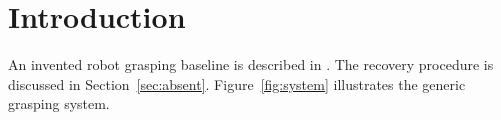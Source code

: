 \section{Introduction}
\label{sec:shared}
An invented robot grasping baseline is described in \citep{grasp_baseline,missing_robot_study}.
The recovery procedure is discussed in Section~\ref{sec:absent}.
Figure~\ref{fig:system} illustrates the generic grasping system.

